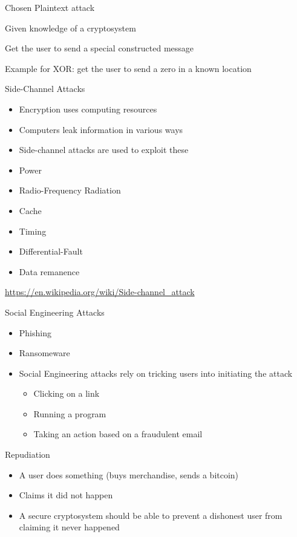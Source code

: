 \begin{withoutheadline}
\begin{frame}{Chosen Plaintext attack}
    \item Given knowledge of a cryptosystem
    \item Get the user to send a special constructed message
    \item Example for XOR: get the user to send a zero in a known location
\end{frame}

\begin{frame}{Side-Channel Attacks}
\begin{itemize}
    \item Encryption uses computing resources
    \item Computers leak information in various ways
    \item Side-channel attacks are used to exploit these
    \item Power
    \item Radio-Frequency Radiation
    \item Cache
    \item Timing
    \item Differential-Fault
    \item Data remanence
\end{itemize}
\url{https://en.wikipedia.org/wiki/Side-channel_attack}
\end{frame}

\begin{frame}{Social Engineering Attacks}
\begin{itemize}
    \item Phishing
    \item Ransomeware
    \item Social Engineering attacks rely on tricking users into initiating the attack
    \begin{itemize}
        \item Clicking on a link
        \item Running a program
        \item Taking an action based on a fraudulent email
    \end{itemize}
\end{itemize}
\end{frame}

\begin{frame}{Repudiation}
\begin{itemize}
    \item A user does something (buys merchandise, sends a bitcoin)
    \item Claims it did not happen
    \item A secure cryptosystem should be able to prevent a dishonest user from claiming it never happened
\end{itemize}
\end{frame}


\end{withoutheadline}
